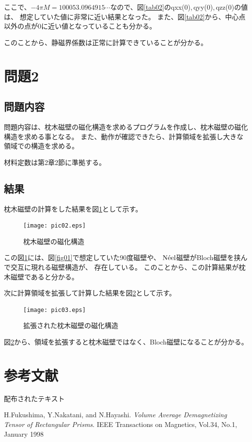 \documentclass{jsarticle}
\begin{document}
ここで、$-4\pi M = 100053.0964915\cdots$なので、図\ref{tab02}のqxx(0),\,qyy(0),\,qzz(0)の値は、
想定していた値に非常に近い結果となった。
また、図\ref{tab02}から、中心点以外の点が0に近い値となっていることも分かる。

このことから、静磁界係数は正常に計算できていることが分かる。

\section{問題2}
\subsection{問題内容}
問題内容は、枕木磁壁の磁化構造を求めるプログラムを作成し、枕木磁壁の磁化構造を求める事となる。
また、動作が確認できたら、計算領域を拡張し大きな領域での構造を求める。

材料定数は第2章2節に準拠する。

\subsection{結果}
枕木磁壁の計算をした結果を図\ref{fig02}として示す。
\begin{figure}[H]
	\centering
	\texttt{[image: pic02.eps]}
	\caption{枕木磁壁の磁化構造}
	\label{fig02}
\end{figure}

この図\ref{fig02}には、図\ref{fig01}で想定していた90度磁壁や、
$\mathrm{N\Acute{e}el}$磁壁がBloch磁壁を挟んで交互に現れる磁壁構造が、
存在している。
このことから、この計算結果が枕木磁壁であると分かる。

次に計算領域を拡張して計算した結果を図\ref{fig03}として示す。
\begin{figure}[H]
	\centering
	\texttt{[image: pic03.eps]}
	\caption{拡張された枕木磁壁の磁化構造}
	\label{fig03}
\end{figure}

図\ref{fig03}から、領域を拡張すると枕木磁壁ではなく、Bloch磁壁になることが分かる。


\section{参考文献}

\begin{thebibliography}{9}
	\item 配布されたテキスト
	\item 
		H.Fukushima, Y.Nakatani, and N.Hayashi.
		\textit{Volume Average Demagnetizing Tensor of Rectangular Prisms}.
		IEEE Transactions on Magnetics, Vol.34, No.1, January 1998
\end{thebibliography}
\end{document}
